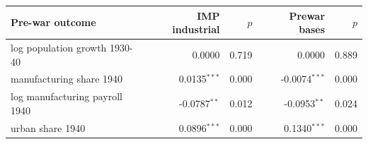 \begin{tabular}{lrrrr}
\toprule
Pre-war outcome & IMP industrial & $p$ & Prewar bases & $p$ \\
\midrule
log population growth 1930-40 & 0.0000 & 0.719 & 0.0000 & 0.889 \\
manufacturing share 1940 & 0.0135$^{***}$ & 0.000 & -0.0074$^{***}$ & 0.000 \\
log manufacturing payroll 1940 & -0.0787$^{**}$ & 0.012 & -0.0953$^{**}$ & 0.024 \\
urban share 1940 & 0.0896$^{***}$ & 0.000 & 0.1340$^{***}$ & 0.000 \\
\bottomrule
\end{tabular}